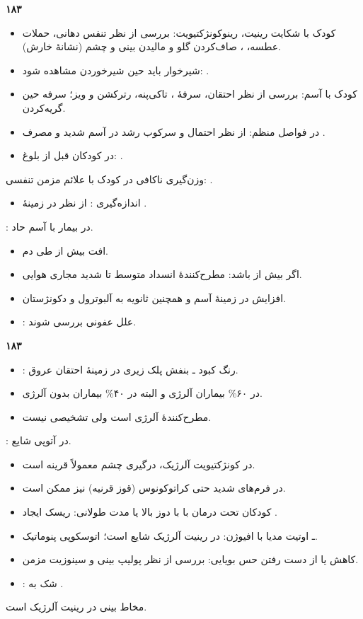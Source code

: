 \noindent\textbf{۱۸۳}\par
\begin{itemize}
\item کودک با شکایت رینیت، رینوکونژکتیویت: بررسی از نظر تنفس دهانی، حملات عطسه، ، صاف‌کردن گلو و مالیدن بینی و چشم (نشانهٔ خارش).
\item شیرخوار باید حین شیرخوردن مشاهده شود: .
\item کودک با آسم: بررسی از نظر احتقان، سرفهٔ ، تاکی‌پنه، رترکشن و ویز؛ سرفه حین گریه‌کردن.
\item {} در فواصل منظم: از نظر احتمال  و سرکوب رشد در آسم شدید و مصرف .
\item {} در کودکان قبل از بلوغ: .
\end{itemize}
وزن‌گیری ناکافی در کودک با علائم مزمن تنفسی: .
\begin{itemize}
\item اندازه‌گیری : از نظر  در زمینهٔ .
\end{itemize}
\noindent{}: در بیمار با آسم حاد.
\begin{itemize}
\item افت بیش از  طی دم.
\item اگر بیش از  باشد: مطرح‌کنندهٔ انسداد متوسط تا شدید مجاری هوایی.
\item افزایش  در زمینهٔ  آسم و همچنین ثانویه به آلبوترول و دکونژستان.
\item {}: علل عفونی بررسی شوند.
\end{itemize}

\noindent\textbf{۱۸۳}\par
\begin{itemize}
\item {}: رنگ کبود ـ بنفش پلک زیری در زمینهٔ احتقان عروق.
\item در ۶۰\% بیماران آلرژی و البته در ۴۰\% بیماران بدون آلرژی.
\item مطرح‌کنندهٔ آلرژی است ولی تشخیصی نیست.
\end{itemize}
\noindent{}: در آتوپی شایع.
\begin{itemize}
\item در کونژکتیویت آلرژیک، درگیری چشم معمولاً قرینه است.
\item در فرم‌های شدید حتی کراتوکونوس (قوز قرنیه) نیز ممکن است.
\item کودکان تحت درمان با  با دوز بالا یا مدت طولانی: ریسک ایجاد .
\item {} ـ اوتیت مدیا با افیوژن: در رینیت آلرژیک شایع است؛ اتوسکوپی پنوماتیک.
\item کاهش یا از دست رفتن حس بویایی: بررسی از نظر پولیپ بینی و سینوزیت مزمن.
\item {}: شک به .
\end{itemize}
مخاط بینی در رینیت آلرژیک  است.

